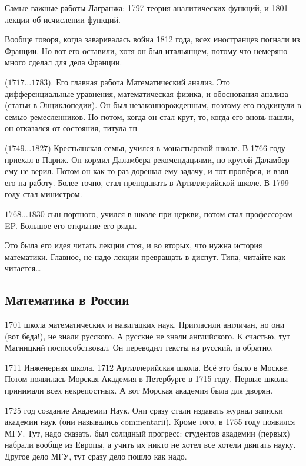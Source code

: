 \documentclass[a4paper,oneside,fleqn,10pt]{article}
\newcommand{\pe}[2]{${#1}\ldots{#2}$}
\begin{document}
Самые важные работы Лагранжа: 1797 теория аналитических функций, и 1801 лекции об исчислении функций.

Вообще говоря, когда заваривалась война 1812 года, всех иностранцев погнали из Франции.
Но вот его оставили, хотя он был итальянцем, потому что немеряно много сделал для дела Франции.

 (\pe{1717}{1783}). Его главная работа Математический анализ.
Это дифференциальные уравнения, математическая физика, и обоснования анализа (статьи в Энциклопедии).
Он был незаконнорожденным, поэтому его подкинули в семью ремесленников.
Но потом, когда он стал крут, то, когда его вновь нашли, он отказался от состояния, титула тп

 (\pe{1749}{1827})
Крестьянская семья, учился в монастырской школе.
В 1766 году приехал в Париж. Он кормил Даламбера рекомендациями, но крутой Даламбер
ему не верил. Потом он как-то раз дорешал ему задачу, и тот пропёрся, и взял его на работу.
Более точно, стал преподавать в Артиллерийской школе. В 1799 году стал министром.

 \pe{1768}{1830} сын портного, учился в школе при церкви, потом стал профессором EP.
Большое его открытие его ряды.

Это была его идея читать лекции стоя, и во вторых, что нужна история математики.
Главное, не надо лекции превращать в диспут. Типа, читайте как читается\ldots

\subsection{Математика в России}

1701 школа математических и навигацких наук.
Пригласили англичан, но они (вот беда!), не знали русского. А русские
не знали английского. К счастью, тут Магницкий поспособствовал. Он переводил
тексты на русский, и обратно.

1711 Инженерная школа. 1712 Артиллерийская школа. Всё это было в Москве.
Потом появилась Морская Академия в Петербурге в 1715 году. Первые школы принимали
всех некрепостных. А вот Морская академия была для дворян.

1725 год создание Академии Наук. Они сразу стали издавать журнал записки академии наук (они назывались
commentarii). Кроме того, в 1755 году появился МГУ. Тут, надо сказать, был солидный прогресс: студентов
академии (первых) набрали вообще из Европы, а учить их никто не хотел все хотели двигать науку.
Другое дело МГУ, тут сразу дело пошло как надо.
\end{document}
